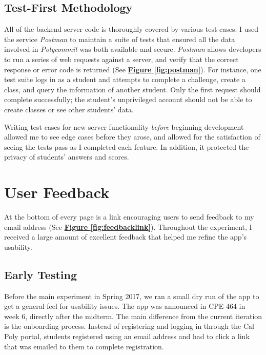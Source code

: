 \subsection{Test-First Methodology}
\par All of the backend server code is thoroughly covered by various test cases. I used the service \textit{Postman} to maintain a suite of tests that ensured all the data involved in \textit{Polycommit} was both available and secure. \textit{Postman} allows developers to run a series of web requests against a server, and verify that the correct response or error code is returned (See  \textbf{\hyperref[fig:polycommit5]{Figure \ref*{fig:postman}}}). For instance, one test suite logs in as a student and attempts to complete a challenge, create a class, and query the information of another student. Only the first request should complete successfully; the student's unprivileged account should not be able to create classes or see other students' data.

\par Writing test cases for new server functionality \textit{before} beginning development allowed me to see edge cases before they arose, and allowed for the satisfaction of seeing the tests pass as I completed each feature. In addition, it protected the privacy of students' answers and scores.



\section{User Feedback}
\par At the bottom of every page is a link encouraging users to send feedback to my email address (See \textbf{\hyperref[fig:feedbacklink]{Figure \ref*{fig:feedbacklink}}}). Throughout the experiment, I received a large amount of excellent feedback that helped me refine the app's usability.

\subsection{Early Testing}
\par Before the main experiment in Spring 2017, we ran a small dry run of the app to get a general feel for usability issues. The app was announced in CPE 464 in week 6, directly after the midterm. The main difference from the current iteration is the onboarding process. Instead of registering and logging in through the Cal Poly portal, students registered using an email address and had to click a link that was emailed to them to complete registration.

